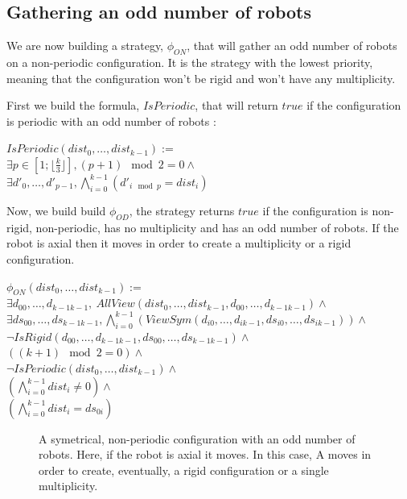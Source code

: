 \documentclass{article}
\begin{document}
\subsection{Gathering an odd number of robots}

We are now building a strategy, $\phi_{ON}$, that will gather an odd number of robots on a non-periodic configuration. It is the strategy with the lowest priority, meaning that the configuration won't be rigid and won't have any multiplicity.

First we build the formula, $IsPeriodic$, that will return $true$ if the configuration is periodic with an odd number of robots :

\begin{center}
    
$IsPeriodic(dist_{0}, \ldots , dist_{k-1}):=$\\
$\exists p \in [1; \lfloor \frac{k}{3} \rfloor ], (p+1) \mod{2} = 0 \land $\\
$\exists d'_{0}, \ldots , d'_{p-1}, \bigwedge_{i=0}^{k-1} (d'_{i\mod{p}} = dist_{i})$
\end{center}

Now, we build build $\phi_{OD}$, the strategy returns $true$ if the configuration is non-rigid, non-periodic, has no multiplicity and has an odd number of robots. If the robot is axial then it moves in order to create a multiplicity or a rigid configuration.

\begin{center}
    
$\phi_{ON}(dist_{0}, \ldots , dist_{k-1}):=$\\
$\exists d_{00}, \ldots ,d_{k-1k-1},\ AllView(dist_{0}, \ldots ,dist_{k-1}, d_{00}, \ldots ,d_{k-1k-1})\land$\\
$\exists ds_{00}, \ldots ,ds_{k-1k-1}, \bigwedge_{i=0}^{k-1} (ViewSym(d_{i0}, \ldots , d_{ik-1}, ds_{i0}, \ldots , ds_{ik-1}))\land$\\
$\lnot IsRigid(d_{00}, \ldots ,d_{k-1k-1}, ds_{00}, \ldots ,ds_{k-1k-1}) \land $\\
$((k+1) \mod{2} = 0) \land $\\
$\lnot IsPeriodic(dist_{0}, \ldots , dist_{k-1}) \land $\\
$(\bigwedge_{i=0}^{k-1} dist_{i} \not= 0) \land $\\
$(\bigwedge_{i=0}^{k-1} dist_{i} = ds_{0i})$
\end{center}

\begin{figure}[!hp]
    \centering
    \def\svgscale{0.3}
    
    \caption{A symetrical, non-periodic configuration with an odd number of robots. Here, if the robot is axial it moves. In this case, A moves in order to create, eventually, a rigid configuration or a single multiplicity.}
    \label{dessinOdd}
\end{figure}
\end{document}
